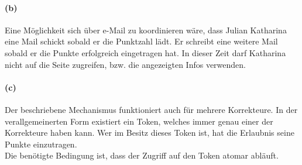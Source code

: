 \documentclass[a4paper]{article}
\begin{document}
\paragraph{(b)}
Eine Möglichkeit sich über e-Mail zu koordinieren wäre, dass Julian Katharina eine Mail schickt sobald er die Punktzahl lädt. Er schreibt eine weitere Mail sobald er die Punkte erfolgreich eingetragen hat. In dieser Zeit darf Katharina nicht auf die Seite zugreifen, bzw. die angezeigten Infos verwenden.

\paragraph{(c)}
Der beschriebene Mechanismus funktioniert auch für mehrere Korrekteure. In der verallgemeinerten Form existiert ein Token, welches immer genau einer der Korrekteure haben kann. Wer im Besitz dieses Token ist, hat die Erlaubnis seine Punkte einzutragen.\\
Die benötigte Bedingung ist, dass der Zugriff auf den Token atomar abläuft.
\end{document}
